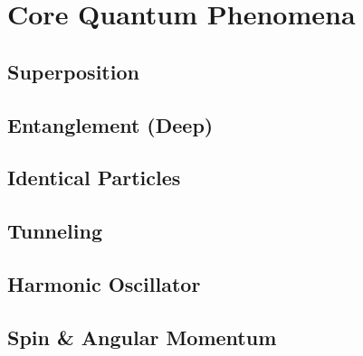 \chapter{Core Quantum Phenomena}

\section{Superposition}

\section{Entanglement (Deep)}

\section{Identical Particles}

\section{Tunneling}

\section{Harmonic Oscillator}

\section{Spin \& Angular Momentum}





